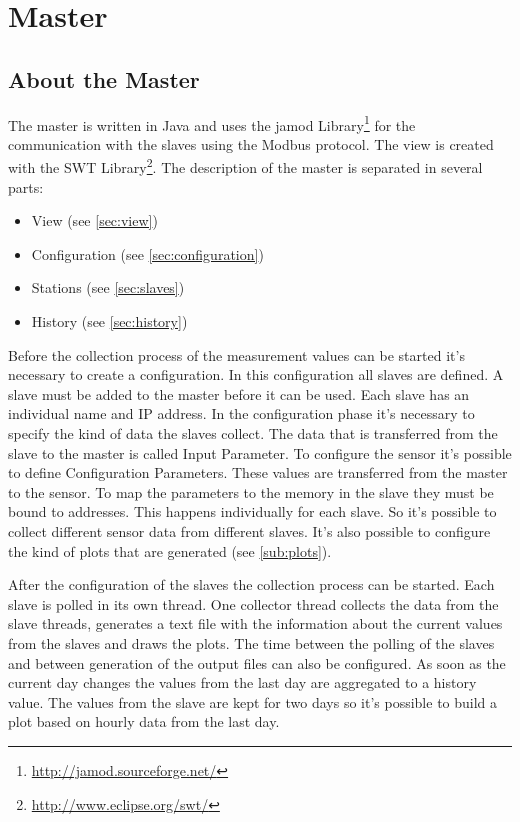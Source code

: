 
\chapter{Master}

\section{About the Master} %
\label{sec:about_the_master}

The master is written in Java and uses the jamod Library\footnote{\url{http://jamod.sourceforge.net/}} for the communication with the slaves using the Modbus protocol. The view is created with the SWT Library\footnote{\url{http://www.eclipse.org/swt/}}. 
The description of the master is separated in several parts:
\begin{itemize}
	\item View (see \ref{sec:view})
	\item Configuration (see \ref{sec:configuration})
	\item Stations  (see \ref{sec:slaves})
	\item History (see \ref{sec:history})
\end{itemize}

Before the collection process of the measurement values can be started it's necessary to create a configuration. In this configuration all slaves are defined. A slave must be added to the master before it can be used. Each slave has an individual name and IP address. In the configuration phase it's necessary to specify the kind of data the slaves collect. The data that is transferred from the slave to the master is called Input Parameter. To configure the sensor it's possible to define Configuration Parameters. These values are transferred from the master to the sensor. To map the parameters to the memory in the slave they must be bound to addresses. This happens individually for each slave. So it's possible to collect different sensor data from different slaves. It's also possible to configure the kind of plots that are generated (see \ref{sub:plots}).

After the configuration of the slaves the collection process can be started. Each slave is polled in its own thread. One collector thread collects the data from the slave threads, generates a text file with the information about the current values from the slaves and draws the plots. The time between the polling of the slaves and between generation of the output files can also be configured. As soon as the current day changes the values from the last day are aggregated to a history value. The values from the slave are kept for two days so it's possible to build a plot based on hourly data from the last day. 

